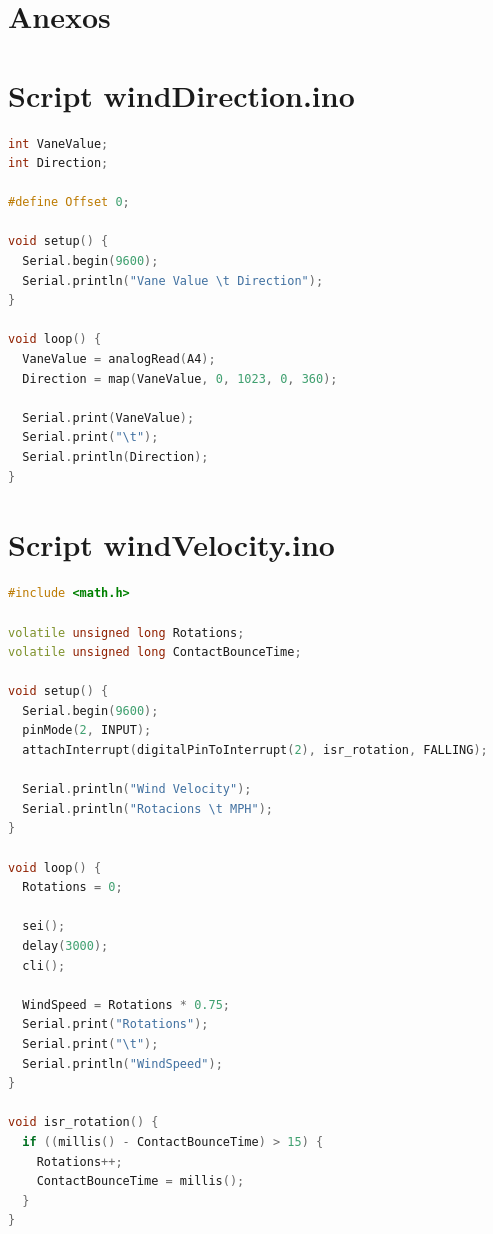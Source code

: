 \documentclass[a4paper, 11pt]{article}
\begin{document}
\newpage
\section{Anexos}
\appendix
\renewcommand{\thesection}{\Alph{section}}
\section{Script windDirection.ino}
\begin{lstlisting}[language = C++]
int VaneValue;
int Direction;

#define Offset 0;

void setup() {
  Serial.begin(9600);
  Serial.println("Vane Value \t Direction");
}

void loop() {
  VaneValue = analogRead(A4);
  Direction = map(VaneValue, 0, 1023, 0, 360);

  Serial.print(VaneValue);
  Serial.print("\t");
  Serial.println(Direction);
}
\end{lstlisting}
\newpage

\section{Script windVelocity.ino}
\begin{lstlisting}[language = C++]
#include <math.h>

volatile unsigned long Rotations;
volatile unsigned long ContactBounceTime;

void setup() {
  Serial.begin(9600);
  pinMode(2, INPUT);
  attachInterrupt(digitalPinToInterrupt(2), isr_rotation, FALLING);

  Serial.println("Wind Velocity");
  Serial.println("Rotacions \t MPH");
}

void loop() {
  Rotations = 0;

  sei();
  delay(3000);
  cli();

  WindSpeed = Rotations * 0.75;
  Serial.print("Rotations");
  Serial.print("\t");
  Serial.println("WindSpeed");
}
  
void isr_rotation() {
  if ((millis() - ContactBounceTime) > 15) {
    Rotations++;
    ContactBounceTime = millis();
  }
}
\end{lstlisting}
\newpage
\end{document}
